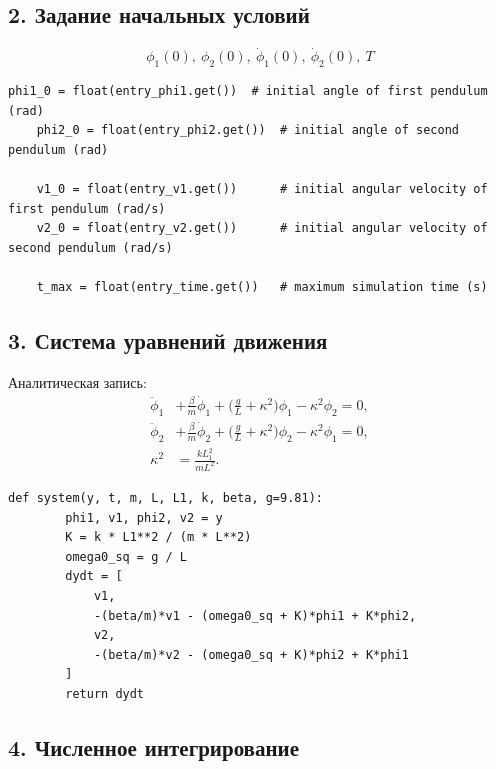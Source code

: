 \documentclass[a4paper,11pt]{article}
\theoremstyle{definition}
\begin{document}
\subsection*{2. Задание начальных условий}
\begin{equation}
  \phi_1(0),\ \phi_2(0),\ \dot{\phi}_1(0),\ \dot{\phi}_2(0),\ T\label{eq:equation}
\end{equation}

\begin{lstlisting}[language=MyPython,label={lst:lstlisting2}]
    phi1_0 = float(entry_phi1.get())  # initial angle of first pendulum (rad)
    phi2_0 = float(entry_phi2.get())  # initial angle of second pendulum (rad)

    v1_0 = float(entry_v1.get())      # initial angular velocity of first pendulum (rad/s)
    v2_0 = float(entry_v2.get())      # initial angular velocity of second pendulum (rad/s)

    t_max = float(entry_time.get())   # maximum simulation time (s)
\end{lstlisting}

\subsection*{3. Система уравнений движения}

Аналитическая запись:
\begin{align*}
  \ddot{\phi}_1 &+ \frac{\beta}{m} \dot{\phi}_1 + \bigl(\tfrac{g}{L} + \kappa^2\bigr)\phi_1 - \kappa^2 \phi_2 = 0, \\
  \ddot{\phi}_2 &+ \frac{\beta}{m} \dot{\phi}_2 + \bigl(\tfrac{g}{L} + \kappa^2\bigr)\phi_2 - \kappa^2 \phi_1 = 0, \\
  \kappa^2 &= \frac{k L_1^2}{m L^2}.
\end{align*}

\begin{lstlisting}[language=MyPython,label={lst:lstlisting}]
    def system(y, t, m, L, L1, k, beta, g=9.81):
        phi1, v1, phi2, v2 = y
        K = k * L1**2 / (m * L**2)
        omega0_sq = g / L
        dydt = [
            v1,
            -(beta/m)*v1 - (omega0_sq + K)*phi1 + K*phi2,
            v2,
            -(beta/m)*v2 - (omega0_sq + K)*phi2 + K*phi1
        ]
        return dydt
\end{lstlisting}

\subsection*{4. Численное интегрирование}
\end{document}
